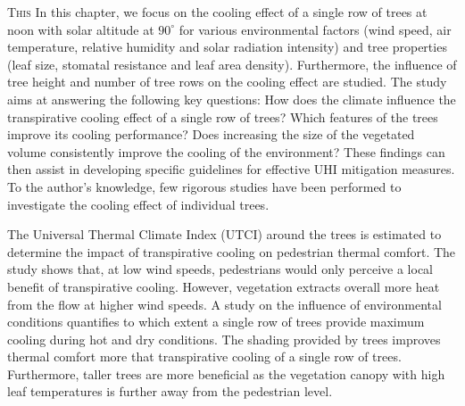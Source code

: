 \lettrine[lines=3,nindent=0em,loversize=0.1]{T}{his} 
In this chapter, we focus on the cooling effect of a single row of trees at noon with solar altitude at $90^{\circ}$ for various environmental factors (wind speed, air temperature, relative humidity and solar radiation intensity) and tree properties (leaf size, stomatal resistance and leaf area density). Furthermore, the influence of tree height and number of tree rows on the cooling effect are studied. The study aims at answering the following key questions: How does the climate influence the transpirative cooling effect of a single row of trees? Which features of the trees improve its cooling performance? Does increasing the size of the vegetated volume consistently improve the cooling of the environment? These findings can then assist in developing specific guidelines for effective UHI mitigation measures. To the author’s knowledge, few rigorous studies have been performed to investigate the cooling effect of individual trees. 

The Universal Thermal Climate Index (UTCI) around the trees is estimated to determine the impact of transpirative cooling on pedestrian thermal comfort. The study shows that, at low wind speeds, pedestrians would only perceive a local benefit of transpirative cooling. However, vegetation extracts overall more heat from the flow at higher wind speeds. A study on the influence of environmental conditions quantifies to which extent a single row of trees provide maximum cooling during hot and dry conditions. The shading provided by trees improves thermal comfort more that transpirative cooling of a single row of trees. Furthermore, taller trees are more beneficial as the vegetation canopy with high leaf temperatures is further away from the pedestrian level.

